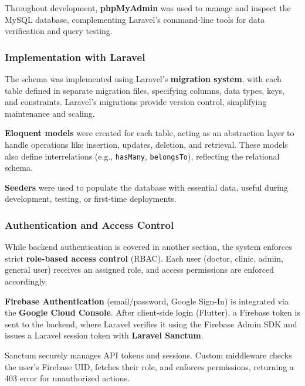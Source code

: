 \documentclass[12pt]{report}
\begin{document}
Throughout development, \textbf{phpMyAdmin} was used to manage and inspect the MySQL database, complementing Laravel’s command-line tools for data verification and query testing.

\vspace{0.5cm}

\subsubsection*{Implementation with Laravel}
The schema was implemented using Laravel’s \textbf{migration system}, with each table defined in separate migration files, specifying columns, data types, keys, and constraints. Laravel’s migrations provide version control, simplifying maintenance and scaling.

\textbf{Eloquent models} were created for each table, acting as an abstraction layer to handle operations like insertion, updates, deletion, and retrieval. These models also define interrelations (e.g., \texttt{hasMany}, \texttt{belongsTo}), reflecting the relational schema.

\textbf{Seeders} were used to populate the database with essential data, useful during development, testing, or first-time deployments.

\vspace{0.5cm}

\subsubsection*{Authentication and Access Control}
While backend authentication is covered in another section, the system enforces strict \textbf{role-based access control} (RBAC). Each user (doctor, clinic, admin, general user) receives an assigned role, and access permissions are enforced accordingly.

\textbf{Firebase Authentication} (email/password, Google Sign-In) is integrated via the \textbf{Google Cloud Console}. After client-side login (Flutter), a Firebase token is sent to the backend, where Laravel verifies it using the Firebase Admin SDK and issues a Laravel session token with \textbf{Laravel Sanctum}.

Sanctum securely manages API tokens and sessions. Custom middleware checks the user’s Firebase UID, fetches their role, and enforces permissions, returning a 403 error for unauthorized actions.

\vspace{0.5cm}
\end{document}
